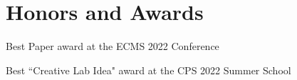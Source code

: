 \section{\sc Honors and Awards}
Best Paper award at the ECMS 2022 Conference

Best ``Creative Lab Idea" award at the CPS 2022 Summer School